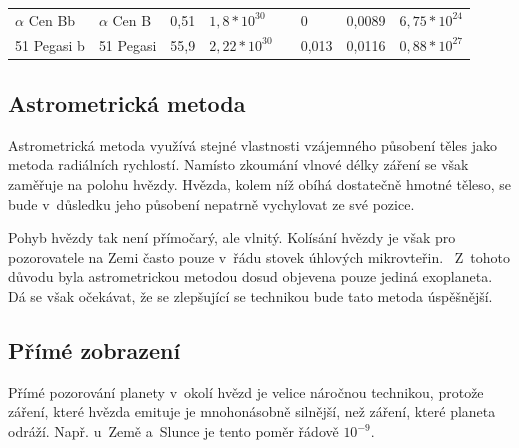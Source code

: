 \documentclass[a4paper,12pt]{article}
\begin{document}
{{{{\begin{tabular}{|l|l|l|l|l|l|l|l|}
		\cline{1-1}\cline{3-3}\cline{6-8}
		\cline{1-4}\cline{6-8}


		$\alpha$ Cen Bb & $\alpha$ Cen B & 0,51 & $1,8 * 10^{30}$ & & 0 & 0,0089 & \textbf{$6,75 * 10^{24}$} \\	
		\cline{1-4}\cline{6-8}
		51 Pegasi b & 51 Pegasi & 55,9 & $2,22 * 10^{30}$ & & 0,013 & 0,0116 & \textbf{$0,88 * 10^{27}$}  \\		
		\hline
	\end{tabular}
}


\vspace{-10pt}

\subsection{Astrometrická metoda}


Astrometrická metoda využívá stejné vlastnosti vzájemného působení těles jako metoda radiálních rychlostí. Namísto zkoumání vlnové délky záření se však zaměřuje na polohu hvězdy. Hvězda, kolem níž obíhá dostatečně hmotné těleso, se bude v~důsledku jeho působení nepatrně vychylovat ze své pozice.~\cite{methods}

Pohyb hvězdy tak není přímočarý, ale vlnitý. Kolísání hvězdy je však pro pozorovatele na Zemi často pouze v~řádu stovek úhlových mikrovteřin.~\cite{methods} Z~tohoto důvodu byla astrometrickou metodou dosud objevena pouze jediná exoplaneta. Dá se však očekávat, že se zlepšující se technikou bude tato metoda úspěšnější.~\cite{nasadata}

\drawgimp[2]

\subsection{Přímé zobrazení}


Přímé pozorování planety v~okolí hvězd je velice náročnou technikou, protože záření, které hvězda emituje je mnohonásobně silnější, než záření, které planeta odráží. Např. u~Země a~Slunce je tento poměr řádově $10^{-9}$.~\cite{methods}

}}}
\end{document}
